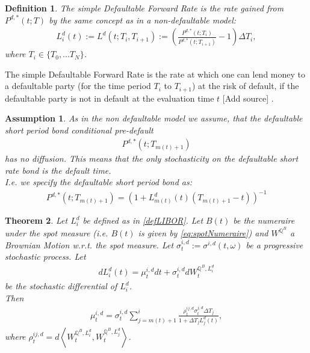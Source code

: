 \documentclass[12pt]{article}
\newtheorem{assumption}{Assumption}[section]
\newtheorem{theorem}{Theorem}[section]
\newtheorem{definition}[theorem]{Definition}
\begin{document}
	\begin{definition}
		The \emph{simple Defaultable Forward Rate} is the rate gained from \(P^{d,*}(t; T)\) by the same concept as in a non-defaultable model:
		\begin{align}\label{defLIBOR}
		L^{d}_i(t) := L^{d}(t; T_i, T_{i+1}) := \left( \frac{P^{d,*}(t; T_i)}{P^{d,*}(t; T_{i+1})} - 1\right) \Delta T_i,
		\end{align}
		where \(T_i \in \{T_0, ... T_N\}\).
	\end{definition}
	The simple Defaultable Forward Rate is the rate at which one can lend money to a defaultable party (for the time period \(T_i\) to \(T_{i+1}\)) at the risk of default, if the defaultable party is not in default at the evaluation time \(t\) \color{red}[Add source]\color{black} %
	.
	
	\begin{assumption}
		\label{as:DLMMShortPeriodBond}
		As in the non defaultable model we assume, that the defaultable short period bond conditional pre-default
		\begin{align*}
			P^{d,*}(t;T_{m(t)+1})
		\end{align*}
		has no diffusion. This means that the only stochasticity on the defaultable short rate bond is the default time.\\
		I.e. we specify the defaultable short period bond as:
		\begin{align*}
			P^{d,*}(t;T_{m(t)+1}) = (1 + L^d_{m(t)}(t)(T_{m(t)+1} - t))^{-1}
		\end{align*}
	\end{assumption}
	
	\begin{theorem}
		Let $L^d_i$ be defined as in \cref{defLIBOR}. Let $B(t)$ be the numeraire under the spot measure (i.e. $B(t)$ is given by \cref{eq:spotNumeraire}) and $W^{\mathbb{Q}^B}$ a Brownian Motion w.r.t. the spot measure.
		Let $\sigma^{i, d}_t:=\sigma^{i, d}(t, \omega)$ be a progressive stochastic process. Let 
		\begin{align}
			dL^d_i(t) = \mu^{i, d}_t dt + \sigma^{i, d}_t dW^{\mathbb{Q}^B, L^d_i}_t
		\end{align}
		be the stochastic differential of $L^d_i$.\\
		Then 
		\begin{align}\label{defDriftTheo}
			\mu^{i, d}_t = \sigma^{i, d}_t\sum_{j=m(t)+1}^{i}\frac{\rho^{i j, d}_t \sigma^{j, d}_t\Delta T_j}{1 + \Delta T_j L^d_j(t)},
		\end{align}
		where $ \rho^{i j, d}_t = d\left\langle W^{\mathbb{Q}^B, L^d_i}_t,  W^{\mathbb{Q}^B, L^d_j}_t \right\rangle $.
	\end{theorem}
	
\end{document}
